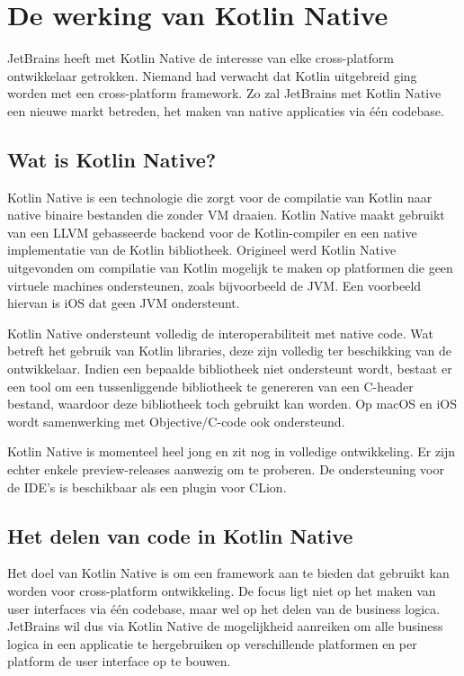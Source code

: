 
\chapter{De werking van Kotlin Native}
JetBrains heeft met Kotlin Native de interesse van elke cross-platform ontwikkelaar getrokken. Niemand had verwacht dat Kotlin uitgebreid ging worden met een cross-platform framework. Zo zal JetBrains met Kotlin Native een nieuwe markt betreden, het maken van native applicaties via één codebase.
\label{ch:kotlinnative}

\section{Wat is Kotlin Native?}
Kotlin Native is een technologie die zorgt voor de compilatie van Kotlin naar native binaire bestanden die zonder VM draaien. Kotlin Native maakt gebruikt van een LLVM gebasseerde backend voor de Kotlin-compiler en een native implementatie van de Kotlin bibliotheek. Origineel werd Kotlin Native uitgevonden om compilatie van Kotlin mogelijk te maken op platformen die geen virtuele machines ondersteunen, zoals bijvoorbeeld de JVM. Een voorbeeld hiervan is iOS dat geen JVM ondersteunt.

Kotlin Native ondersteunt volledig de interoperabiliteit met native code. Wat betreft het gebruik van Kotlin libraries, deze zijn volledig ter beschikking van de ontwikkelaar. Indien een bepaalde bibliotheek niet ondersteunt wordt, bestaat er een tool om een tussenliggende bibliotheek te genereren van een C-header bestand, waardoor deze bibliotheek toch gebruikt kan worden.  Op macOS en iOS wordt samenwerking met Objective/C-code ook ondersteund.

Kotlin Native is momenteel heel jong en zit nog in volledige ontwikkeling. Er zijn echter enkele preview-releases aanwezig om te proberen. De ondersteuning voor de IDE's is beschikbaar als een plugin voor CLion.

\section{Het delen van code in Kotlin Native}
\label{sec:sharingcode}
Het doel van Kotlin Native is om een framework aan te bieden dat gebruikt kan worden voor cross-platform ontwikkeling. De focus ligt niet op het maken van user interfaces via één codebase, maar wel op het delen van de business logica. JetBrains wil dus via Kotlin Native de mogelijkheid aanreiken om alle business logica in een applicatie te hergebruiken op verschillende platformen en per platform de user interface op te bouwen.

